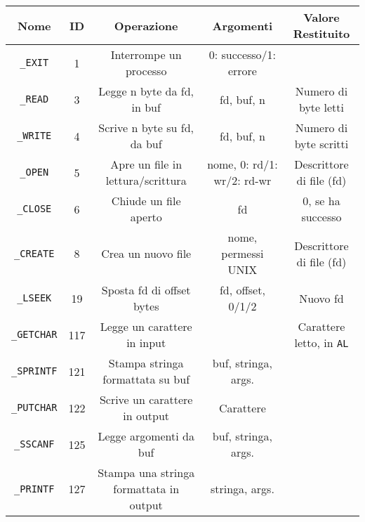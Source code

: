 \documentclass{standalone}
\begin{document}
    \begin{tabular}{|c||c|c|c|c|}
        \hline
        Nome & ID & Operazione & Argomenti & Valore Restituito\\
        \hline\hline
        \verb|_EXIT|&1&Interrompe un processo&0: successo/1: errore&\\
        \hline
        \verb|_READ|&3&Legge n byte da fd, in buf& fd, buf, n & Numero di byte letti\\
        \hline
        \verb|_WRITE|&4&Scrive n byte su fd, da buf& fd, buf, n& Numero di byte scritti\\
        \hline
        \verb|_OPEN|&5& Apre un file in lettura/scrittura & nome, 0: rd/1: wr/2: rd-wr & Descrittore di file (fd)\\
        \hline
        \verb|_CLOSE|&6&Chiude un file aperto& fd& 0, se ha successo \\
        \hline 
        \verb|_CREATE|& 8 & Crea un nuovo file & nome, permessi UNIX & Descrittore di file (fd)\\
        \hline
        \verb|_LSEEK| &19& Sposta fd di offset bytes & fd, offset, 0/1/2& Nuovo fd\\
        \hline
        \verb|_GETCHAR| &117& Legge un carattere in input && Carattere letto, in \verb|AL|\\
        \hline
        \verb|_SPRINTF|&121& Stampa stringa formattata su buf&buf, stringa, args.&\\
        \hline
        \verb|_PUTCHAR|&122&Scrive un carattere in output &Carattere&\\
        \hline
        \verb|_SSCANF|&125&Legge argomenti da buf&buf, stringa, args.&\\
        \hline
        \verb|_PRINTF|&127&Stampa una stringa formattata in output&stringa, args.&\\
        \hline
    \end{tabular}
\end{document}
